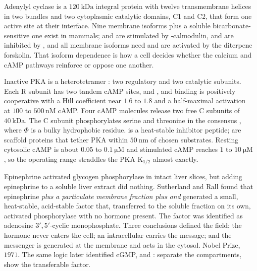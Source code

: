 Adenylyl cyclase is a $120\ \mathrm{kDa}$ integral protein with twelve
transmembrane helices in two bundles and two cytoplasmic catalytic domains, C1 and
C2, that form one active site at their interface. Nine membrane isoforms plus a
soluble bicarbonate-sensitive one exist in mammals;  and  are
stimulated by -calmodulin,  and  are inhibited by
, and all membrane isoforms need  and are activated by the
diterpene forskolin. That isoform dependence is how a cell decides whether the
calcium and cAMP pathways reinforce or oppose one another.

\begin{defbox}[title={DEFINITIONS: protein kinase A}]
Inactive PKA is a heterotetramer : two regulatory and two catalytic
subunits. Each R subunit has two tandem cAMP sites,  and , and
binding is positively cooperative with a Hill coefficient near $1.6$ to $1.8$ and a
half-maximal activation at $100$ to $500\ \mathrm{nM}$ cAMP. Four cAMP molecules
release two free C subunits of $40\ \mathrm{kDa}$. The C subunit phosphorylates
serine and threonine in the consensus , where $\Phi$ is a bulky
hydrophobic residue.  is a heat-stable inhibitor peptide;  are
scaffold proteins that tether PKA within $50\ \mathrm{nm}$ of chosen substrates.
Resting cytosolic cAMP is about $0.05$ to $0.1\ \mathrm{\mu M}$ and stimulated cAMP
reaches $1$ to $10\ \mathrm{\mu M}$, so the operating range straddles the PKA
$\mathrm{K_{1/2}}$ almost exactly.
\end{defbox}

\begin{expbox}[title={EXPERIMENT: Sutherland and Rall, 1956--1958}]
Epinephrine activated glycogen phosphorylase in intact liver slices, but adding
epinephrine to a soluble liver extract did nothing. Sutherland and Rall found that
epinephrine \emph{plus a particulate membrane fraction plus  and }
generated a small, heat-stable, acid-stable factor that, transferred to the soluble
fraction on its own, activated phosphorylase with no hormone present. The factor was
identified as adenosine $3',5'$-cyclic monophosphate. Three conclusions defined the
field: the hormone never enters the cell; an intracellular 
carries the message; and the messenger is generated at the membrane and acts in the
cytosol. Nobel Prize, $1971$. The same logic later identified cGMP,  and
: separate the compartments, show the transferable factor.
\end{expbox}

